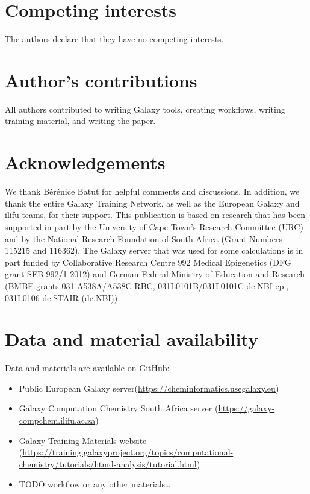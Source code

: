 \documentclass[twocolumn]{bmcart}%
\begin{document}
\begin{backmatter}

\section*{Competing interests}
  The authors declare that they have no competing interests.

\section*{Author's contributions}
All authors contributed to writing Galaxy tools, creating workflows, writing training material, and writing the paper.

\section*{Acknowledgements}
We thank Bérénice Batut for helpful comments and discussions. In addition, we thank the entire Galaxy Training Network, as well as the European Galaxy and ilifu teams, for their support. 
This publication is based on research that has been supported in part by the University of Cape Town’s Research Committee (URC) and by the National Research Foundation of South Africa (Grant Numbers 115215 and 116362).
The Galaxy server that was used for some calculations is in part funded by Collaborative Research Centre 992 Medical Epigenetics (DFG grant SFB 992/1 2012) and German Federal Ministry of Education and Research (BMBF grants 031 A538A/A538C RBC, 031L0101B/031L0101C de.NBI-epi, 031L0106 de.STAIR (de.NBI)).

\section*{Data and material availability}
  Data and materials are available on GitHub:

  \begin{itemize}
  \item   Public European Galaxy server(\url{https://cheminformatics.usegalaxy.eu}) 
  \item Galaxy Computation Chemistry South Africa server (\url{https://galaxy-compchem.ilifu.ac.za})
  \item Galaxy Training Materials website (\url{https://training.galaxyproject.org/topics/computational-chemistry/tutorials/htmd-analysis/tutorial.html})
  \item   TODO workflow or any other materials\ldots
\end{itemize}



\end{backmatter}
\end{document}
